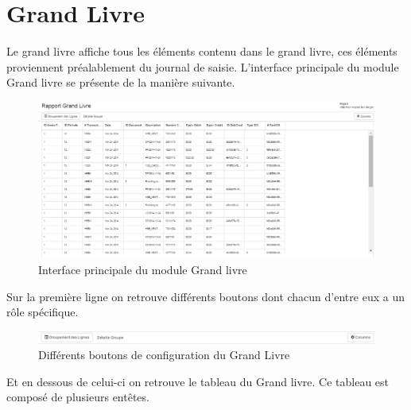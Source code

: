 \documentclass[12pt,a4paper]{report}
\begin{document}
\section{Grand Livre}
Le grand livre affiche tous les éléments contenu dans le grand livre, ces éléments proviennent préalablement du journal de saisie. L'interface principale du module Grand livre se présente de la manière suivante.


\begin{figure}[h]
\begin{center}
\includegraphics[width=13cm]{pic/GrandLivre.png}
\end{center}
\caption{Interface principale du module Grand livre}
\label{Interface principale du module Grand livre}
\end{figure}

Sur la première ligne on retrouve différents boutons dont chacun d'entre eux a un rôle spécifique.
\begin{figure}[h]
\begin{center}
\includegraphics[width=14cm]{pic/BoutCongGrandLivre.png}
\end{center}
\caption{Différents boutons de configuration du Grand Livre}
\label{Différents boutons de configuration du Grand Livre}
\end{figure}

\newpage

Et en dessous de celui-ci on retrouve le tableau du Grand livre. Ce tableau est composé de plusieurs entêtes. 
\end{document}
